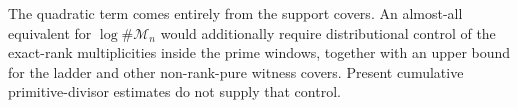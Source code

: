 The quadratic term comes entirely from the support covers.  An almost-all
equivalent for $\log\#\mathcal M_n$ would additionally require distributional
control of the exact-rank multiplicities inside the prime windows, together
with an upper bound for the ladder and other non-rank-pure witness covers.
Present cumulative primitive-divisor estimates do not supply that control.
